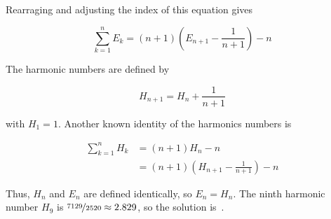 \documentclass{article}
\begin{document}
Rearraging and adjusting the index of this equation gives

\[
\sum_{k=1}^{n}E_{k} = (n+1)\left(E_{n+1}-\frac{1}{n+1}\right)-n
\]

The harmonic numbers are defined by

\[
H_{n+1} = H_{n}+\frac{1}{n+1}
\]

with $H_{1}=1$.
Another known identity of the harmonics numbers is

\begin{align*}
\sum_{k=1}^{n}H_{k} &= (n+1)H_{n}-n \\
                    &= (n+1)\left(H_{n+1}-\frac{1}{n+1}\right)-n
\end{align*}

Thus, $H_{n}$ and $E_{n}$ are defined identically, so $E_{n}=H_{n}$.
The ninth harmonic number $H_{9}$ is $\nicefrac{7129}{2520}\approx2.829$, so the solution is \,.
\end{document}
